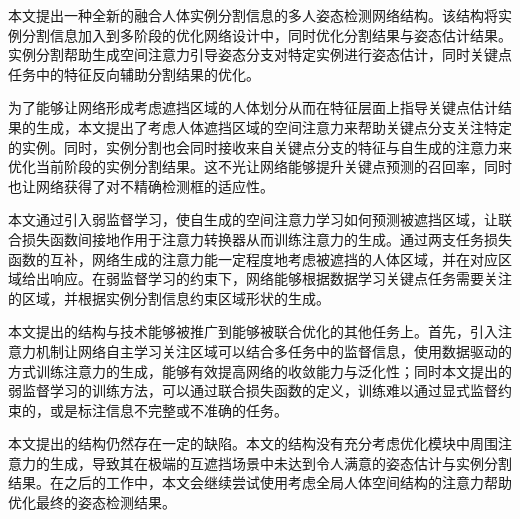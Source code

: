 \begin{conclusion}
	
本文提出一种全新的融合人体实例分割信息的多人姿态检测网络结构。该结构将实例分割信息加入到多阶段的优化网络设计中，同时优化分割结果与姿态估计结果。实例分割帮助生成空间注意力引导姿态分支对特定实例进行姿态估计，同时关键点任务中的特征反向辅助分割结果的优化。

为了能够让网络形成考虑遮挡区域的人体划分从而在特征层面上指导关键点估计结果的生成，本文提出了考虑人体遮挡区域的空间注意力来帮助关键点分支关注特定的实例。同时，实例分割也会同时接收来自关键点分支的特征与自生成的注意力来优化当前阶段的实例分割结果。这不光让网络能够提升关键点预测的召回率，同时也让网络获得了对不精确检测框的适应性。

本文通过引入弱监督学习，使自生成的空间注意力学习如何预测被遮挡区域，让联合损失函数间接地作用于注意力转换器从而训练注意力的生成。通过两支任务损失函数的互补，网络生成的注意力能一定程度地考虑被遮挡的人体区域，并在对应区域给出响应。在弱监督学习的约束下，网络能够根据数据学习关键点任务需要关注的区域，并根据实例分割信息约束区域形状的生成。

本文提出的结构与技术能够被推广到能够被联合优化的其他任务上。首先，引入注意力机制让网络自主学习关注区域可以结合多任务中的监督信息，使用数据驱动的方式训练注意力的生成，能够有效提高网络的收敛能力与泛化性；同时本文提出的弱监督学习的训练方法，可以通过联合损失函数的定义，训练难以通过显式监督约束的，或是标注信息不完整或不准确的任务。

本文提出的结构仍然存在一定的缺陷。本文的结构没有充分考虑优化模块中周围注意力的生成，导致其在极端的互遮挡场景中未达到令人满意的姿态估计与实例分割结果。在之后的工作中，本文会继续尝试使用考虑全局人体空间结构的注意力帮助优化最终的姿态检测结果。

\end{conclusion}